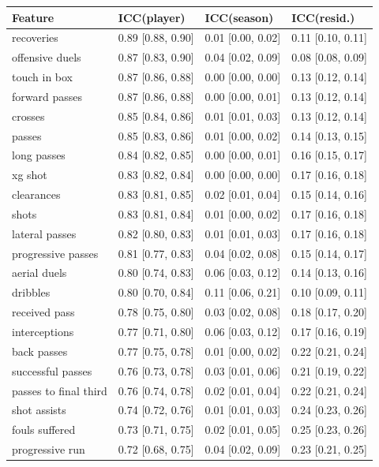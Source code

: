 
\begin{longtable}{llll}
\toprule
Feature & ICC(player) & ICC(season) & ICC(resid.)\\
\midrule
recoveries & 0.89 [0.88, 0.90] & 0.01 [0.00, 0.02] & 0.11 [0.10, 0.11]\\
offensive duels & 0.87 [0.83, 0.90] & 0.04 [0.02, 0.09] & 0.08 [0.08, 0.09]\\
touch in box & 0.87 [0.86, 0.88] & 0.00 [0.00, 0.00] & 0.13 [0.12, 0.14]\\
forward passes & 0.87 [0.86, 0.88] & 0.00 [0.00, 0.01] & 0.13 [0.12, 0.14]\\
crosses & 0.85 [0.84, 0.86] & 0.01 [0.01, 0.03] & 0.13 [0.12, 0.14]\\
passes & 0.85 [0.83, 0.86] & 0.01 [0.00, 0.02] & 0.14 [0.13, 0.15]\\
long passes & 0.84 [0.82, 0.85] & 0.00 [0.00, 0.01] & 0.16 [0.15, 0.17]\\
xg shot & 0.83 [0.82, 0.84] & 0.00 [0.00, 0.00] & 0.17 [0.16, 0.18]\\
clearances & 0.83 [0.81, 0.85] & 0.02 [0.01, 0.04] & 0.15 [0.14, 0.16]\\
shots & 0.83 [0.81, 0.84] & 0.01 [0.00, 0.02] & 0.17 [0.16, 0.18]\\
lateral passes & 0.82 [0.80, 0.83] & 0.01 [0.01, 0.03] & 0.17 [0.16, 0.18]\\
progressive passes & 0.81 [0.77, 0.83] & 0.04 [0.02, 0.08] & 0.15 [0.14, 0.17]\\
aerial duels & 0.80 [0.74, 0.83] & 0.06 [0.03, 0.12] & 0.14 [0.13, 0.16]\\
dribbles & 0.80 [0.70, 0.84] & 0.11 [0.06, 0.21] & 0.10 [0.09, 0.11]\\
received pass & 0.78 [0.75, 0.80] & 0.03 [0.02, 0.08] & 0.18 [0.17, 0.20]\\
interceptions & 0.77 [0.71, 0.80] & 0.06 [0.03, 0.12] & 0.17 [0.16, 0.19]\\
back passes & 0.77 [0.75, 0.78] & 0.01 [0.00, 0.02] & 0.22 [0.21, 0.24]\\
successful passes & 0.76 [0.73, 0.78] & 0.03 [0.01, 0.06] & 0.21 [0.19, 0.22]\\
passes to final third & 0.76 [0.74, 0.78] & 0.02 [0.01, 0.04] & 0.22 [0.21, 0.24]\\
shot assists & 0.74 [0.72, 0.76] & 0.01 [0.01, 0.03] & 0.24 [0.23, 0.26]\\
fouls suffered & 0.73 [0.71, 0.75] & 0.02 [0.01, 0.05] & 0.25 [0.23, 0.26]\\
progressive run & 0.72 [0.68, 0.75] & 0.04 [0.02, 0.09] & 0.23 [0.21, 0.25]\\

\end{longtable}
